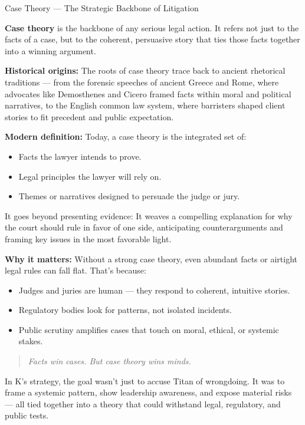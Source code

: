 \begin{HistoricalSidebar}{Case Theory --- The Strategic Backbone of Litigation}

    \textbf{Case theory} is the backbone of any serious legal action.  
    It refers not just to the facts of a case, but to the coherent, persuasive story that ties those facts together into a winning argument.
    
    \medskip
    
    \textbf{Historical origins:}
    The roots of case theory trace back to ancient rhetorical traditions —  
    from the forensic speeches of ancient Greece and Rome,  
    where advocates like Demosthenes and Cicero framed facts within moral and political narratives,  
    to the English common law system,  
    where barristers shaped client stories to fit precedent and public expectation.
    
    \medskip
    
    \textbf{Modern definition:}
    Today, a case theory is the integrated set of:
    
    \begin{itemize}
        \item Facts the lawyer intends to prove.
        \item Legal principles the lawyer will rely on.
        \item Themes or narratives designed to persuade the judge or jury.
    \end{itemize}
    
    It goes beyond presenting evidence:
    It weaves a compelling explanation for why the court should rule in favor of one side,  
    anticipating counterarguments and framing key issues in the most favorable light.
    
    \medskip
    
    \textbf{Why it matters:}
    Without a strong case theory, even abundant facts or airtight legal rules can fall flat.  
    That’s because:
    
    \begin{itemize}
        \item Judges and juries are human — they respond to coherent, intuitive stories.
        \item Regulatory bodies look for patterns, not isolated incidents.
        \item Public scrutiny amplifies cases that touch on moral, ethical, or systemic stakes.
    \end{itemize}
    
    \medskip
    
    \begin{quote}
        \textit{Facts win cases.  
        But case theory wins minds.}
    \end{quote}
    
    In K’s strategy, the goal wasn’t just to accuse Titan of wrongdoing.
    It was to frame a systemic pattern,  
    show leadership awareness,  
    and expose material risks —  
    all tied together into a theory that could withstand legal, regulatory, and public tests.
    
\end{HistoricalSidebar}

